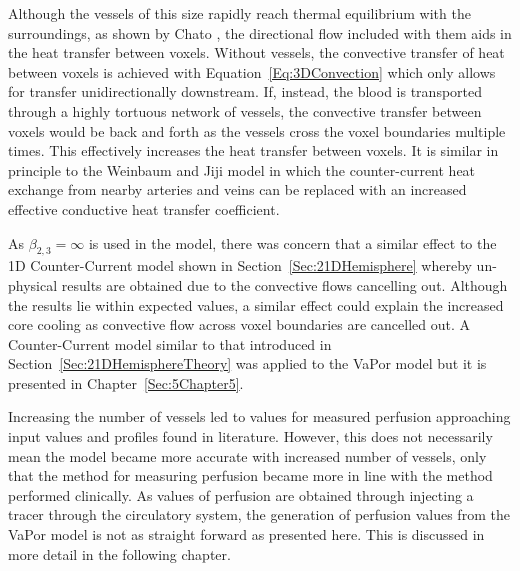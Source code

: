 \documentclass[11pt,english,a4paper,twoside,openright]{report}
\begin{document}
{{{{{{{{Although the vessels of this size rapidly reach thermal equilibrium with the surroundings, as shown by Chato \cite{chato1980heat}, the directional flow included with them aids in the heat transfer between voxels. Without vessels, the convective transfer of heat between voxels is achieved with Equation~\ref{Eq:3DConvection} which only allows for transfer unidirectionally downstream. If, instead, the blood is transported through a highly tortuous network of vessels, the convective transfer between voxels would be back and forth as the vessels cross the voxel boundaries multiple times. This effectively increases the heat transfer between voxels. It is similar in principle to the Weinbaum and Jiji model \cite{weinbaum1985new} in which the counter-current heat exchange from nearby arteries and veins can be replaced with an increased effective conductive heat transfer coefficient. 

As $\beta_{2,3} = \infty$ is used in the model, there was concern that a similar effect to the 1D Counter-Current model shown in Section~\ref{Sec:21DHemisphere} whereby un-physical results are obtained due to the convective flows cancelling out. Although the results lie within expected values, a similar effect could explain the increased core cooling as convective flow across voxel boundaries are cancelled out. A Counter-Current model similar to that introduced in Section~\ref{Sec:21DHemisphereTheory} was applied to the VaPor model but it is presented in Chapter~\ref{Sec:5Chapter5}.

Increasing the number of vessels led to values for measured perfusion approaching input values and profiles found in literature. However, this does not necessarily mean the model became more accurate with increased number of vessels, only that the method for measuring perfusion became more in line with the method performed clinically. As  values of perfusion are obtained through injecting a tracer through the circulatory system, the generation of perfusion values from the VaPor model is not as straight forward as presented here. This is discussed in more detail in the following chapter.  

}}}}}}}}
\end{document}
